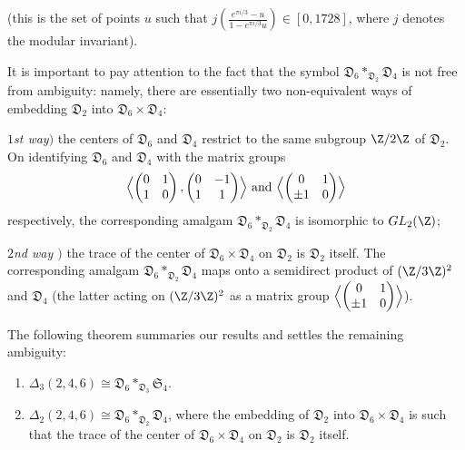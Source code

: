 \begin{para}
\bigskip\noindent
{\small (this is the set of points $u$ such that 
$j(\frac{e^{\pi i/3}-u}{1-e^{\pi i/3}u})\in [0,1728]$, 
where $j$ denotes the modular invariant).}

\medskip
It is important to pay attention to the fact that the symbol 
$\mathfrak{D}_6 \ast_{\mathfrak{D}_2}\mathfrak{D}_4$ is not free from
ambiguity: namely, there are essentially two non-equivalent ways of
embedding $\mathfrak{D}_2$ into $\mathfrak{D}_6\times \mathfrak{D}_4$:

{\it $1$st way$)$} the centers of $\mathfrak{D}_6$ and $\mathfrak{D}_4$ 
restrict to the same subgroup $\Z/2\Z$
of $\mathfrak{D}_2$. On identifying $\mathfrak{D}_6$ and $\mathfrak{D}_4$ with 
the matrix groups
\begin{equation*}
 \Bigl\langle\begin{pmatrix} 0& 1 \\ 1& 0
\end{pmatrix}, \begin{pmatrix} 0& -1 \\ 1& 1
\end{pmatrix}\Bigr\rangle\text{ and }
 \Bigl\langle\begin{pmatrix} 0& 1 \\ \pm1& 0
\end{pmatrix}\Bigr\rangle
\end{equation*}
respectively, the corresponding amalgam 
$\mathfrak{D}_6 \ast_{\mathfrak{D}_2}\mathfrak{D}_4$ is isomorphic 
to $GL_2(\Z)$;

{\it $2$nd way $)$} the trace of the center of $\mathfrak{D}_6\times 
\mathfrak{D}_4$ on $\mathfrak{D}_2$  is $\mathfrak{D}_2$ itself. The
corresponding amalgam $\mathfrak{D}_6
\ast_{\mathfrak{D}_2}\mathfrak{D}_4$ maps onto  
a semidirect product of $(\Z/3\Z)^2$ and ${\mathfrak{D}_4}$ (the 
latter acting on $(\Z/3\Z)^2$ as a matrix group
$\Bigl\langle
\begin{pmatrix}
 0& 1 \\ \pm1& 0
\end{pmatrix}
\Bigr\rangle$).
\end{para}

The following theorem summaries our results and settles the remaining 
ambiguity:

\begin{thm}\label{thm::6.4.5}
 \begin{enumerate}
  \item $\Delta_3(2,4,6)\cong \mathfrak{D}_6 
        \ast_{\mathfrak{D}_3} \mathfrak{S}_4$.
  \item $\Delta_2(2,4,6)\cong\mathfrak{D}_6\ast_{\mathfrak{D}_2}
	\mathfrak{D}_4$, where the embedding of $\mathfrak{D}_2$ into
	$\mathfrak{D}_6\times \mathfrak{D}_4$ is such that the trace of
	the center of $\mathfrak{D}_6\times \mathfrak{D}_4$ on
	$\mathfrak{D}_2$ is $\mathfrak{D}_2$ itself.
 \end{enumerate} 
\end{thm}

